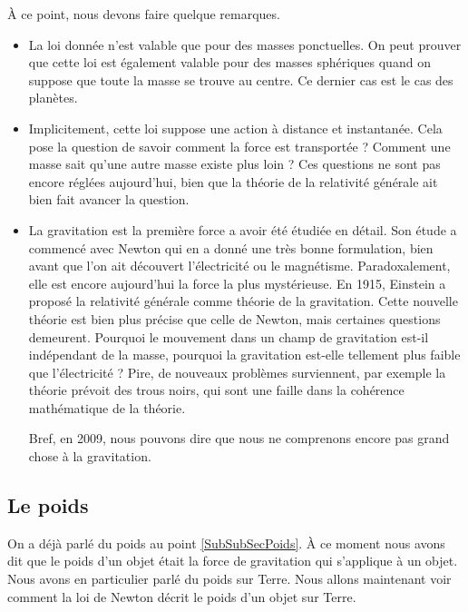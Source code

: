 À ce point, nous devons faire quelque remarques.
\begin{itemize}

\item
La loi donnée n'est valable que pour des masses ponctuelles. On peut prouver que cette loi est également valable pour des masses sphériques quand on suppose que toute la masse se trouve au centre. Ce dernier cas est le cas des planètes.

\item
Implicitement, cette loi suppose une action à distance et instantanée. Cela pose la question de savoir comment la force est transportée ? Comment une masse \og sait\fg{} qu'une autre masse existe plus loin ? Ces questions ne sont pas encore réglées aujourd'hui, bien que la théorie de la relativité générale ait bien fait avancer la question.

\item
La gravitation est la première force a avoir été étudiée en détail. Son étude a commencé avec Newton qui en a donné une très bonne formulation, bien avant que l'on ait découvert l'électricité ou le magnétisme. Paradoxalement, elle est encore aujourd'hui la force la plus mystérieuse. En 1915, Einstein a proposé la relativité générale comme théorie de la gravitation. Cette nouvelle théorie est bien plus précise que celle de Newton, mais certaines questions demeurent. Pourquoi le mouvement dans un champ de gravitation est-il indépendant de la masse, pourquoi la gravitation est-elle tellement plus faible que l'électricité ? Pire, de nouveaux problèmes surviennent, par exemple la théorie prévoit des trous noirs, qui sont une faille dans la cohérence mathématique de la théorie.

Bref, en 2009, nous pouvons dire que nous ne comprenons encore pas grand chose à la gravitation.

\end{itemize}

\subsection{Le poids}		\label{SubSecPoidsGr}

On a déjà parlé du poids au point \ref{SubSubSecPoids}. À ce moment nous avons dit que le poids d'un objet était la force de gravitation qui s'applique à un objet. Nous avons en particulier parlé du poids sur Terre. Nous allons maintenant voir comment la loi de Newton décrit le poids d'un objet sur Terre.

